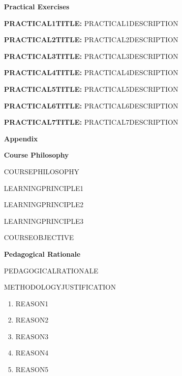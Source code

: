 \documentclass{article}
\begin{document}
{\huge \textbf{Practical Exercises}}

\textbf{PRACTICAL1TITLE:} PRACTICAL1DESCRIPTION
 	
\textbf{PRACTICAL2TITLE:} PRACTICAL2DESCRIPTION
 	
\textbf{PRACTICAL3TITLE:} PRACTICAL3DESCRIPTION
 	
\textbf{PRACTICAL4TITLE:} PRACTICAL4DESCRIPTION
 	
\textbf{PRACTICAL5TITLE:} PRACTICAL5DESCRIPTION
 	
\textbf{PRACTICAL6TITLE:} PRACTICAL6DESCRIPTION
 	
\textbf{PRACTICAL7TITLE:} PRACTICAL7DESCRIPTION



\vspace{1cm}

\pagebreak

{\huge \textbf{Appendix}}

\pagebreak
{\huge \textbf{Course Philosophy}}
\vspace{1cm}

COURSEPHILOSOPHY

LEARNINGPRINCIPLE1

LEARNINGPRINCIPLE2

LEARNINGPRINCIPLE3

COURSEOBJECTIVE

\pagebreak

{\huge \textbf{Pedagogical Rationale}}
\vspace{1cm}

PEDAGOGICALRATIONALE

METHODOLOGYJUSTIFICATION

\begin{enumerate}
	\item REASON1
	
	\item REASON2
	
	\item REASON3
	
	\item REASON4
	
	\item REASON5
	
\end{enumerate}

\pagebreak

\vspace{1cm}
\end{document}
